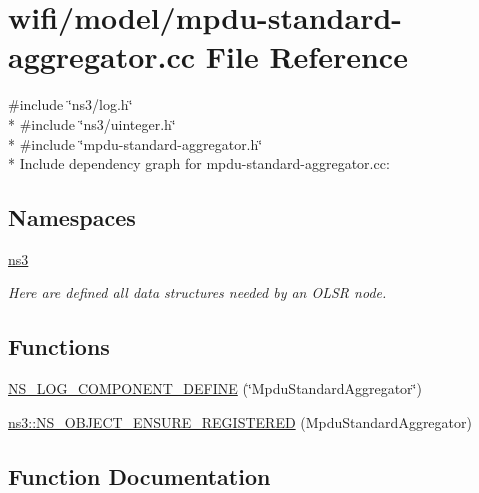 \hypertarget{mpdu-standard-aggregator_8cc}{}\section{wifi/model/mpdu-\/standard-\/aggregator.cc File Reference}
\label{mpdu-standard-aggregator_8cc}
{\ttfamily \#include \char`\"{}ns3/log.\+h\char`\"{}}\\*
{\ttfamily \#include \char`\"{}ns3/uinteger.\+h\char`\"{}}\\*
{\ttfamily \#include \char`\"{}mpdu-\/standard-\/aggregator.\+h\char`\"{}}\\*
Include dependency graph for mpdu-\/standard-\/aggregator.cc\+:
\subsection*{Namespaces}
\begin{DoxyCompactItemize}
\item 
 \hyperlink{namespacens3}{ns3}
\begin{DoxyCompactList}\small\item\em Here are defined all data structures needed by an O\+L\+SR node. \end{DoxyCompactList}\end{DoxyCompactItemize}
\subsection*{Functions}
\begin{DoxyCompactItemize}
\item 
\hyperlink{mpdu-standard-aggregator_8cc_a35d4fd073ba3675547a6440f3cf2c004}{N\+S\+\_\+\+L\+O\+G\+\_\+\+C\+O\+M\+P\+O\+N\+E\+N\+T\+\_\+\+D\+E\+F\+I\+NE} (\char`\"{}Mpdu\+Standard\+Aggregator\char`\"{})
\item 
\hyperlink{namespacens3_af9b7578cd5d7e5d072fa5c9e12494d02}{ns3\+::\+N\+S\+\_\+\+O\+B\+J\+E\+C\+T\+\_\+\+E\+N\+S\+U\+R\+E\+\_\+\+R\+E\+G\+I\+S\+T\+E\+R\+ED} (Mpdu\+Standard\+Aggregator)
\end{DoxyCompactItemize}


\subsection{Function Documentation}
